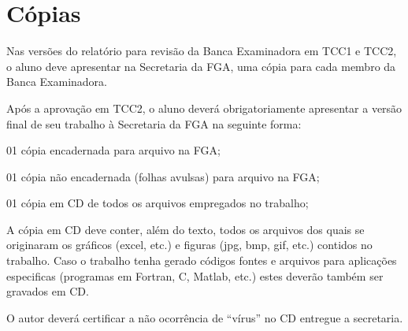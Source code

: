 \section{Cópias}

Nas versões do relatório para revisão da Banca Examinadora em TCC1 e TCC2, o aluno deve apresentar na Secretaria da FGA, uma cópia para cada membro da Banca Examinadora.

Após a aprovação em TCC2, o aluno deverá obrigatoriamente apresentar a 
versão final de seu trabalho à Secretaria da FGA na seguinte forma:

\begin{description}
	\item 01 cópia encadernada para arquivo na FGA;
	\item 01 cópia não encadernada (folhas avulsas) para arquivo na FGA;
	\item 01 cópia em CD de todos os arquivos empregados no trabalho;
\end{description}

A cópia em CD deve conter, além do texto, todos os arquivos dos quais se originaram os gráficos (excel, etc.) e figuras (jpg, bmp, gif, etc.) contidos no trabalho. Caso o trabalho tenha gerado códigos fontes e 
arquivos para aplicações especificas (programas em Fortran, C, Matlab, 
etc.) estes deverão também ser gravados em CD. 

O autor deverá certificar a não ocorrência de “vírus” no CD entregue a 
secretaria. 